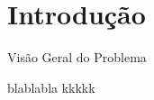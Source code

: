 \section{Introdução}

\begin{frame}{Visão Geral do Problema}
  \vspace{0.1cm}
  \begin{block}{blablabla}
    kkkkk
  \end{block}
\end{frame}
